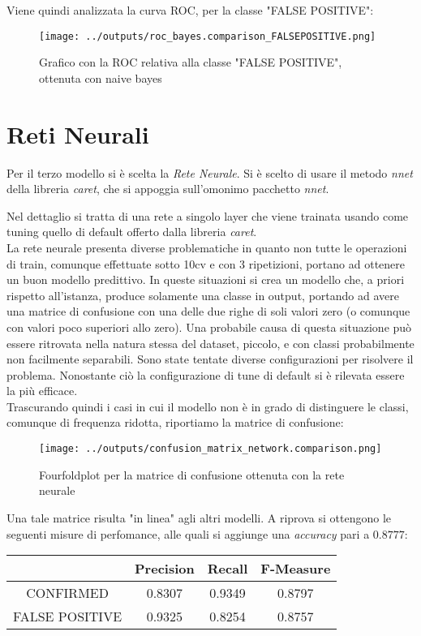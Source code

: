 Viene quindi analizzata la curva ROC, per la classe "FALSE POSITIVE":
\begin{figure}[H]
    \centering
    \texttt{[image: ../outputs/roc\_bayes.comparison\_FALSEPOSITIVE.png]}
    \caption{Grafico con la ROC relativa alla classe "FALSE POSITIVE", ottenuta con 
    naive bayes}
\end{figure}
\section{Reti Neurali}
Per il terzo modello si è scelta la \textit{Rete Neurale}.
Si è scelto di usare il metodo \textit{nnet} della libreria \textit{caret}, 
che si appoggia sull'omonimo pacchetto \textit{nnet}.

Nel dettaglio si tratta di una rete a singolo layer che viene trainata 
usando come tuning quello di default offerto dalla libreria \textit{caret}.\\
La rete neurale presenta diverse problematiche in quanto non tutte le operazioni
di train, comunque effettuate sotto 10cv e con 3 ripetizioni, portano ad 
ottenere un buon modello predittivo. In queste situazioni si crea un modello 
che, a priori rispetto all'istanza, produce solamente una classe in output, 
portando ad avere una matrice di confusione con una delle due righe di soli 
valori zero (o comunque con valori poco superiori allo zero). Una probabile 
causa di questa situazione può essere ritrovata nella natura stessa del dataset, 
piccolo, e con classi probabilmente non facilmente separabili. 
Sono state tentate diverse configurazioni per risolvere il problema. Nonostante 
ciò la configurazione di tune di default si è rilevata essere la più efficace.\\
Trascurando quindi i casi in cui il modello non è in grado di distinguere le 
classi, comunque di frequenza ridotta, riportiamo la matrice di confusione:
\begin{figure}[H]
    \centering
    \texttt{[image: ../outputs/confusion\_matrix\_network.comparison.png]}
    \caption{Fourfoldplot per la matrice di confusione ottenuta con la rete neurale}
\end{figure}
Una tale matrice risulta "in linea" agli altri modelli. 
A riprova si ottengono le seguenti misure di perfomance, alle quali si aggiunge 
una \textit{accuracy} pari a $0.8777$:
\begin{center}
    \begin{tabular}{| c | c c c |} 
    \hline
    & Precision & Recall & F-Measure \\ [0.5ex] 
    \hline\hline
    CONFIRMED  & 0.8307 & 0.9349 & 0.8797 \\ 
    \hline
    FALSE POSITIVE & 0.9325 & 0.8254 & 0.8757 \\ 
    \hline
    \end{tabular}
\end{center}

